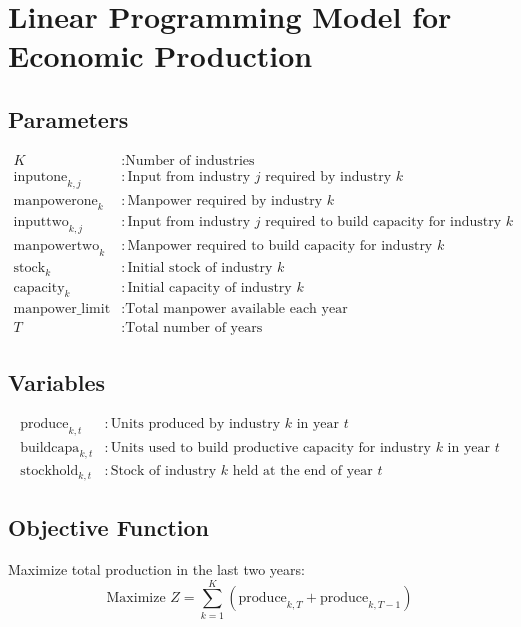 \documentclass{article}
\begin{document}
\section*{Linear Programming Model for Economic Production}

\subsection*{Parameters}
\begin{align*}
K & : \text{Number of industries} \\
\text{inputone}_{k,j} & : \text{Input from industry } j \text{ required by industry } k \\
\text{manpowerone}_{k} & : \text{Manpower required by industry } k \\
\text{inputtwo}_{k,j} & : \text{Input from industry } j \text{ required to build capacity for industry } k \\
\text{manpowertwo}_{k} & : \text{Manpower required to build capacity for industry } k \\
\text{stock}_{k} & : \text{Initial stock of industry } k \\
\text{capacity}_{k} & : \text{Initial capacity of industry } k \\
\text{manpower\_limit} & : \text{Total manpower available each year} \\
T & : \text{Total number of years}
\end{align*}

\subsection*{Variables}
\begin{align*}
\text{produce}_{k,t} & : \text{Units produced by industry } k \text{ in year } t \\
\text{buildcapa}_{k,t} & : \text{Units used to build productive capacity for industry } k \text{ in year } t \\
\text{stockhold}_{k,t} & : \text{Stock of industry } k \text{ held at the end of year } t
\end{align*}

\subsection*{Objective Function}
Maximize total production in the last two years:
\[
\text{Maximize } Z = \sum_{k=1}^{K} \left( \text{produce}_{k,T} + \text{produce}_{k,T-1} \right)
\]
\end{document}

